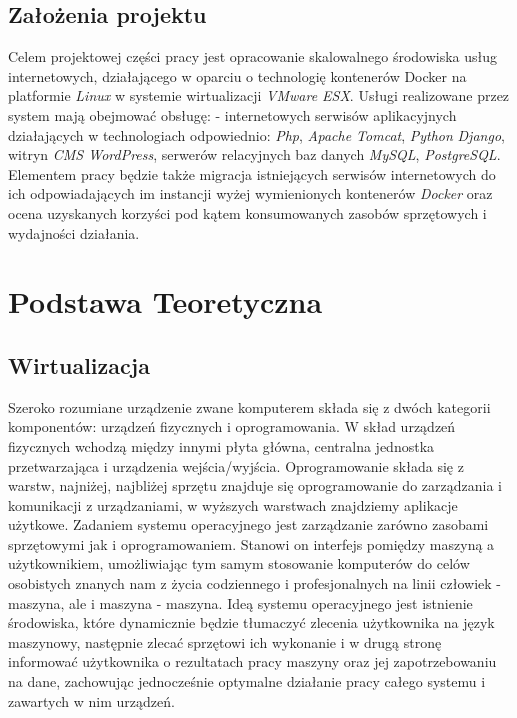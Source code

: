 \documentclass[polish, a4paper, 12pt, oneside]{book}
\begin{document}
	\section{Założenia projektu}
	Celem projektowej części pracy jest opracowanie skalowalnego środowiska usług internetowych, działającego w oparciu o technologię kontenerów Docker na platformie \textit{Linux} w systemie wirtualizacji \textit{VMware ESX}\cite{vmwareesx}. Usługi realizowane przez system mają obejmować obsługę: - internetowych serwisów aplikacyjnych działających w technologiach odpowiednio: \textit{Php}\cite{php}, \textit{Apache Tomcat}\cite{apachetomcat}, \textit{Python}\cite{python} \textit{Django}\cite{django}, witryn \textit{CMS WordPress}\cite{wordpress}, serwerów relacyjnych baz danych \textit{MySQL}\cite{mysql}, \textit{PostgreSQL}\cite{postgresql}. Elementem pracy będzie także migracja istniejących serwisów internetowych do ich odpowiadających im instancji wyżej wymienionych kontenerów \textit{Docker}\cite{docker} oraz ocena uzyskanych korzyści pod kątem konsumowanych zasobów sprzętowych i wydajności działania. 
	
	\chapter{Podstawa Teoretyczna}
	\section{Wirtualizacja}
	Szeroko rozumiane urządzenie zwane komputerem składa się z dwóch kategorii komponentów: urządzeń fizycznych i oprogramowania. W skład urządzeń fizycznych wchodzą między innymi płyta główna, centralna jednostka przetwarzająca i urządzenia wejścia/wyjścia. Oprogramowanie składa się z warstw, najniżej, najbliżej sprzętu znajduje się oprogramowanie do zarządzania i komunikacji z urządzaniami, w wyższych warstwach znajdziemy aplikacje użytkowe. Zadaniem systemu operacyjnego jest zarządzanie zarówno zasobami sprzętowymi jak i oprogramowaniem. Stanowi on interfejs pomiędzy maszyną a użytkownikiem, umożliwiając tym samym stosowanie komputerów do celów osobistych znanych nam z życia codziennego i profesjonalnych na linii człowiek - maszyna, ale i maszyna - maszyna. Ideą systemu operacyjnego jest istnienie środowiska, które dynamicznie będzie tłumaczyć zlecenia użytkownika na język maszynowy, następnie zlecać sprzętowi ich wykonanie i w drugą stronę informować użytkownika o rezultatach pracy maszyny oraz jej zapotrzebowaniu na dane, zachowując jednocześnie optymalne działanie pracy całego systemu i zawartych w nim urządzeń.
	
\end{document}
